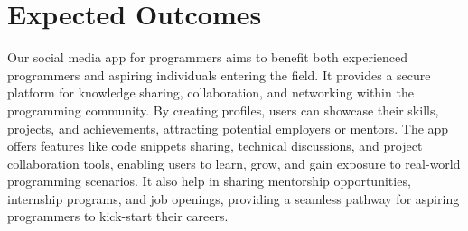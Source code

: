 \documentclass{article}
\begin{document}
\section{Expected Outcomes}
Our social media app for programmers aims to benefit both experienced programmers and aspiring individuals entering the field. It provides a secure platform for knowledge sharing, collaboration, and networking within the programming community. By creating profiles, users can showcase their skills, projects, and achievements, attracting potential employers or mentors. The app offers features like code snippets sharing, technical discussions, and project collaboration tools, enabling users to learn, grow, and gain exposure to real-world programming scenarios. It also help in sharing mentorship opportunities, internship programs, and job openings, providing a seamless pathway for aspiring programmers to kick-start their careers. 
\end{document}

